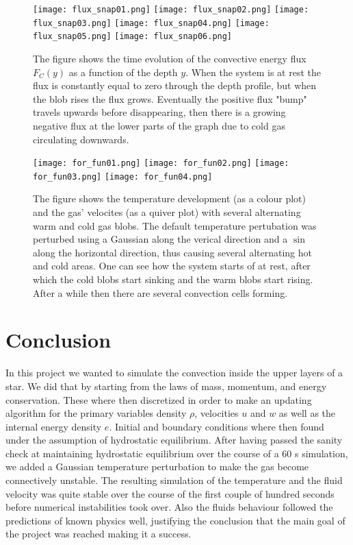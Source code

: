 \documentclass{emulateapj}
\begin{document}
	\begin{figure*}
		\centering
		\texttt{[image: flux\_snap01.png]}
		\texttt{[image: flux\_snap02.png]}
		\texttt{[image: flux\_snap03.png]}
		\texttt{[image: flux\_snap04.png]}
		\texttt{[image: flux\_snap05.png]}
		\texttt{[image: flux\_snap06.png]}
		
		\caption{The figure shows the time evolution of the convective energy flux $F_C(y)$ as a function of the depth $y$. When the system is at rest the flux is constantly equal to zero through the depth profile, but when the blob rises the flux grows. Eventually the positive flux "bump" travels upwards before disappearing, then there is a growing negative flux at the lower parts of the graph due to cold gas circulating downwards.}
		\label{fig:flux}
	\end{figure*}

	\begin{figure*}
		\texttt{[image: for\_fun01.png]}
		\texttt{[image: for\_fun02.png]}
		\texttt{[image: for\_fun03.png]}
		\texttt{[image: for\_fun04.png]}
		\caption{The figure shows the temperature development (as a colour plot) and the gas' velocites (as a quiver plot) with several alternating warm and cold gas blobs. The default temperature pertubation was perturbed using a Gaussian along the verical direction and a $\sin$ along the horizontal direction, thus causing several alternating hot and cold areas. One can see how the system starts of at rest, after which the cold blobs start sinking and the warm blobs start rising. After a while then there are several convection cells forming.}
		\label{fig:bonus}
	\end{figure*}

	\section*{Conclusion}
	In this project we wanted to simulate the convection inside the upper layers of a star. We did that by starting from the laws of mass, momentum, and energy conservation. These where then discretized in order to make an updating algorithm for the primary variables density $\rho$, velocities $u$ and $w$ as well as the internal energy density $e$. Initial and boundary conditions where then found under the assumption of hydrostatic equilibrium. After having passed the sanity check at maintaining hydrostatic equilibrium over the course of a 60 s simulation, we added a Gaussian temperature perturbation to make the gas become connectively unstable. The resulting simulation of the temperature and the fluid velocity was quite stable over the course of the first couple of hundred seconds before numerical instabilities took over. Also the fluids behaviour followed the predictions of known physics well, justifying the conclusion that the main goal of the project was reached making it a success. 
	
\end{document}
